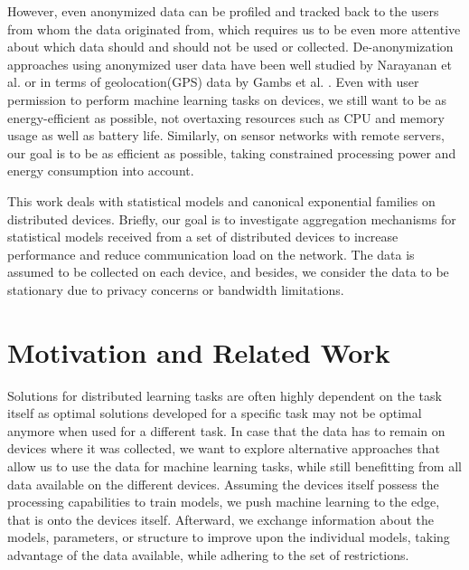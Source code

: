 However, even anonymized data can be profiled and tracked back to the users from whom the data originated from, which requires us to be even more attentive about which data should and should not be used or collected. 
De-anonymization approaches using anonymized user data have been well studied by Narayanan et al. \cite{narayanan2008robust} or in terms of geolocation(GPS) data by Gambs et al. \cite{gambs2014anonymization}.
Even with user permission to perform machine learning tasks on devices, we still want to be as energy-efficient as possible, not overtaxing resources such as CPU and memory usage as well as battery life.
Similarly, on sensor networks with remote servers, our goal is to be as efficient as possible, taking constrained processing power and energy consumption into account.

This work deals with statistical models and canonical exponential families on distributed devices.
Briefly, our goal is to investigate aggregation mechanisms for statistical models received from a set of distributed devices to increase performance and reduce communication load on the network.
The data is assumed to be collected on each device, and besides, we consider the data to be stationary due to privacy concerns or bandwidth limitations.

\section{Motivation and Related Work}
 
Solutions for distributed learning tasks are often highly dependent on the task itself as optimal solutions developed for a specific task may not be optimal anymore when used for a different task.
In case that the data has to remain on devices where it was collected, we want to explore alternative approaches that allow us to use the data for machine learning tasks, while still benefitting from all data available on the different devices.
Assuming the devices itself possess the processing capabilities to train models, we push machine learning to the edge, that is onto the devices itself.
Afterward, we exchange information about the models, parameters, or structure to improve upon the individual models, taking advantage of the data available, while adhering to the set of restrictions.


